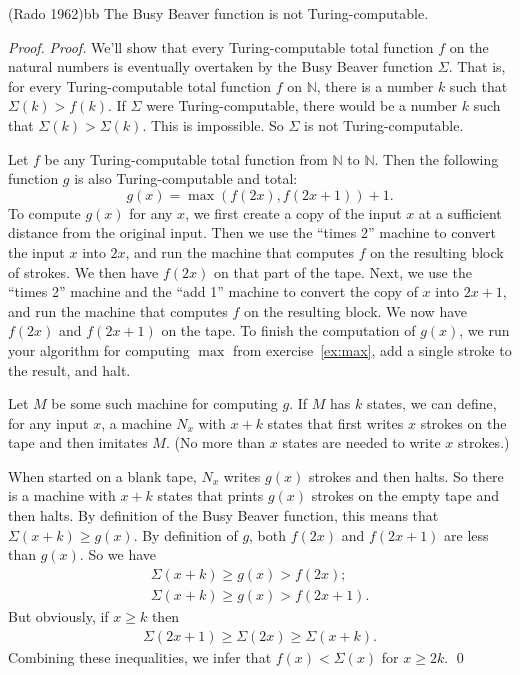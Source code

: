 \begin{theorem}{(Rado 1962)}{bb}
  The Busy Beaver function is not Turing-computable.
\end{theorem}
\begin{proof} \emph{Proof.}
  We'll show that
  every Turing-computable total function $f$ on the natural numbers
  is eventually overtaken by the Busy Beaver function $\Sigma$.
  That is,
  for every Turing-computable total function $f$ on $\mathbb{N}$,
  there is a number $k$ such that $\Sigma(k) > f(k)$.
  If $\Sigma$ were Turing-computable,
  there would be a number $k$ such that $\Sigma(k) > \Sigma(k)$.
  This is impossible.
  So $\Sigma$ is not Turing-computable.

  Let $f$ be any Turing-computable total function from $\mathbb{N}$ to $\mathbb{N}$.
  Then the following function $g$ is also Turing-computable and total:
  \[
    g(x) = \max(f(2x), f(2x+1)) + 1.
  \]
  To compute $g(x)$ for any $x$,
  we first create a copy of the input $x$ at a sufficient distance from the original input.
  Then we use the ``times 2'' machine to convert the input $x$ into $2x$,
  and run the machine that computes $f$ on the resulting block of strokes.
  We then have $f(2x)$ on that part of the tape.
  Next, we use the ``times 2'' machine and the  ``add 1'' machine
  to convert the copy of $x$ into $2x+1$,
  and run the machine that computes $f$ on the resulting block.
  We now have $f(2x)$ and $f(2x+1)$ on the tape.
  To finish the computation of $g(x)$,
  we run your algorithm for computing $\max$ from exercise~\ref{ex:max},
  add a single stroke to the result,
  and halt.

  Let $M$ be some such machine for computing $g$.
  If $M$ has $k$ states,
  we can define, for any input $x$, a machine $N_{x}$ with $x+k$ states that
  first writes $x$ strokes on the tape and then imitates $M$.
  (No more than $x$ states are needed to write $x$ strokes.)
  
  When started on a blank tape,
  $N_{x}$ writes $g(x)$ strokes and then halts.
  So there is a machine with $x+k$ states that prints $g(x)$ strokes on the empty tape and then halts.
  By definition of the Busy Beaver function,
  this means that $\Sigma(x+k) \geq g(x)$.
  By definition of $g$,
  both $f(2x)$ and $f(2x+1)$ are less than $g(x)$.
  So we have
  \begin{gather*}
    \Sigma(x+k) \geq g(x) > f(2x); \\
    \Sigma(x+k) \geq g(x) > f(2x+1).
  \end{gather*}
  But obviously, if $x \geq k$ then
  \begin{gather*}
    \Sigma(2x+1)\geq \Sigma(2x) \geq \Sigma(x+k).
  \end{gather*}
  Combining these inequalities, we infer that $f(x)<\Sigma(x)$ for $x \geq 2k$.
  \qed
\end{proof} %

